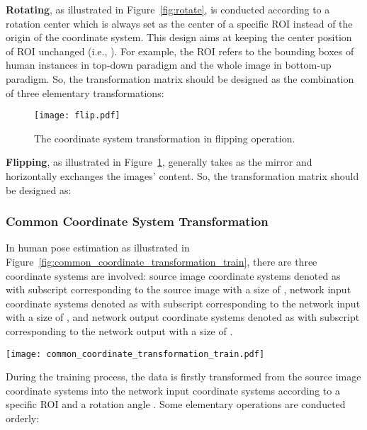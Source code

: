 \documentclass[10pt,journal,compsoc]{IEEEtran}
\begin{document}
\textbf{Rotating}, as illustrated in Figure~\ref{fig:rotate}, is conducted according to a rotation center which is always set as the center of a specific ROI instead of the origin of the coordinate system. This design aims at keeping the center position of ROI unchanged (i.e., ). For example, the ROI refers to the bounding boxes of human instances in top-down paradigm and the whole image in bottom-up paradigm. So, the transformation matrix should be designed as the combination of three elementary transformations:



\begin{figure}[h]
    \centering
    \texttt{[image: flip.pdf]}
    \caption{The coordinate system transformation in flipping operation. }
    \label{fig:flip}
\end{figure}
\textbf{Flipping}, as illustrated in Figure~\ref{fig:flip}, generally takes  as the mirror and horizontally exchanges the images' content. So, the transformation matrix should be designed as:


\subsubsection{Common Coordinate System Transformation}
In human pose estimation as illustrated in Figure~\ref{fig:common_coordinate_transformation_train}, there are three coordinate systems are involved: source image coordinate systems denoted as  with subscript  corresponding to the source image with a size of , network input coordinate systems denoted as  with subscript  corresponding to the network input with a size of , and network output coordinate systems denoted as  with subscript  corresponding to the network output with a size of .

\begin{figure*}[t]
    \centering
    \texttt{[image: common\_coordinate\_transformation\_train.pdf]}
    \caption{The illustration of the common coordinate system transformation in human pose estimation problem. Three coordinate system are involved: source image coordinate system , network input coordinate system  and network output coordinate system . }
    \label{fig:common_coordinate_transformation_train}
\end{figure*}

During the training process, the data is firstly transformed from the source image coordinate systems into the network input coordinate systems according to a specific ROI  and a rotation angle . Some elementary operations are conducted orderly:
\end{document}
